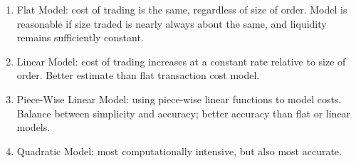 \begin{definition} 
\begin{enumerate}[label=\roman*.]
\setlength{\itemsep}{0pt}
\item Flat Model: cost of trading is the same, regardless of size of order. Model is reasonable if size traded is nearly always about the same, and liquidity remains sufficiently constant.
\item Linear Model: cost of trading increases at a constant rate relative to size of order. Better estimate than flat transaction cost model.
\item Piece-Wise Linear Model: using piece-wise linear functions to model costs. Balance between simplicity and accuracy; better accuracy than flat or linear models.
\item Quadratic Model: most computationally intensive, but also most accurate.
\end{enumerate}
\end{definition}